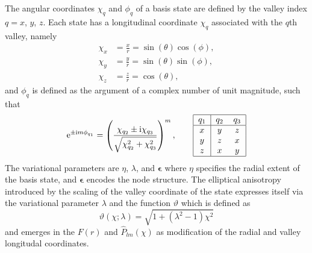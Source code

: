 The angular coordinates $\chi_q$ and $\phi_q$ of a basis
state are defined by the valley index $q = x$, $y$, $z$. Each state
has a longitudinal coordinate $\chi_q$ associated with the $q$th
valley, namely
\begin{align}
  \chi_{x} &= \frac{x}{r} = \sin(\theta)\cos(\phi), \\
  \chi_{y} &= \frac{y}{r} = \sin(\theta)\sin(\phi), \\
  \chi_{z} &= \frac{z}{r} = \cos(\theta), 
\end{align}
and $\phi_q$ is defined as the argument of a complex number of unit
magnitude, such that
\begin{equation}
  \e^{\pm \im m \phi_{q_1}} = \left(\frac{\chi_{q_2} \pm \im \chi_{q_3}}
    {\sqrt{\chi_{q_2}^2 + \chi_{q_3}^2}}\right)^m,
    \quad\quad \mbox{\begin{tabular}{|c|cc|}
        \hline
        $q_1$ & $q_2$ & $q_3$ \\
        \hline
        $x$ & $y$ & $z$ \\
        $y$ & $z$ & $x$ \\
        $z$ & $x$ & $y$ \\
        \hline
    \end{tabular}}
\end{equation}
The variational parameters are $\eta$, $\lambda$, and $\bm{\epsilon}$
where $\eta$ specifies the radial extent of the basis state, and
$\bm{\epsilon}$ encodes the node structure. The elliptical anisotropy
introduced by the scaling of the valley coordinate of the state
expresses itself via the variational parameter $\lambda$ and the
function $\vartheta$ which is defined as
\begin{equation}
  \vartheta(\chi;\lambda) = \sqrt{1 + \left(\lambda^2-1\right)\chi^2}
\end{equation}
and emerges in the $F(r)$ and $\hat{P}_{lm}(\chi)$ as modification of
the radial and valley longitudal coordinates.

